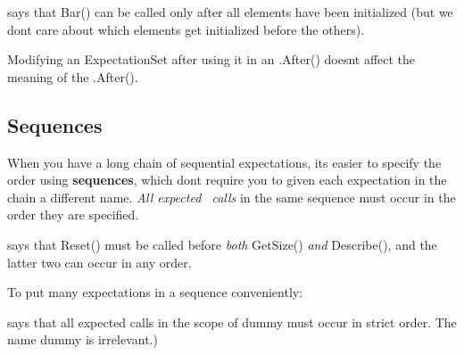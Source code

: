 \begin{DoxyCode}{0}
\DoxyCodeLine{\}}
\end{DoxyCode}
 says that {\ttfamily Bar()} can be called only after all elements have been initialized (but we don\textquotesingle{}t care about which elements get initialized before the others).

Modifying an {\ttfamily Expectation\+Set} after using it in an {\ttfamily .After()} doesn\textquotesingle{}t affect the meaning of the {\ttfamily .After()}.

\subsection*{Sequences}

When you have a long chain of sequential expectations, it\textquotesingle{}s easier to specify the order using {\bfseries{sequences}}, which don\textquotesingle{}t require you to given each expectation in the chain a different name. {\itshape All expected~\newline
 calls} in the same sequence must occur in the order they are specified.


\begin{DoxyCode}{0}
\end{DoxyCode}
 says that {\ttfamily Reset()} must be called before {\itshape both} {\ttfamily Get\+Size()} {\itshape and} {\ttfamily Describe()}, and the latter two can occur in any order.

To put many expectations in a sequence conveniently\+: 
\begin{DoxyCode}{0}
\DoxyCodeLine{\{}
\DoxyCodeLine{}
\DoxyCodeLine{\}}
\end{DoxyCode}
 says that all expected calls in the scope of {\ttfamily dummy} must occur in strict order. The name {\ttfamily dummy} is irrelevant.)


